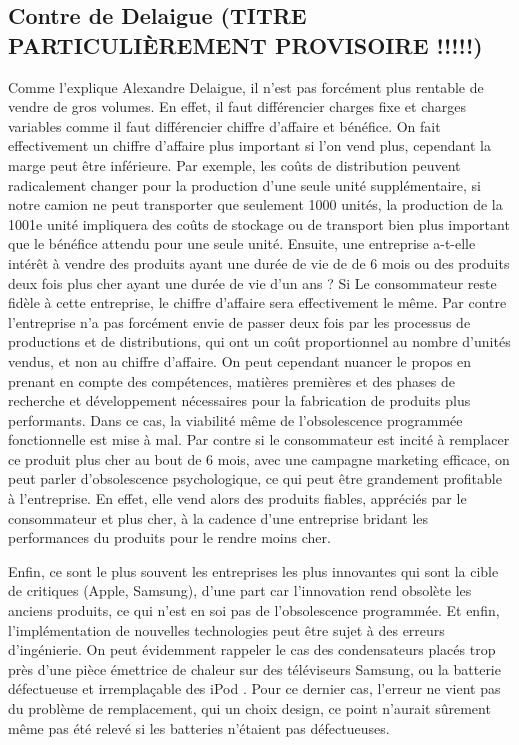 \subsection{Contre de Delaigue (TITRE PARTICULIÈREMENT PROVISOIRE !!!!!)}


Comme l’explique Alexandre Delaigue, il n’est pas forcément plus rentable de vendre de gros volumes. En effet, il faut différencier charges fixe et charges variables comme il faut différencier chiffre d’affaire et bénéfice. On fait effectivement un chiffre d’affaire plus important si l’on vend plus, cependant la marge peut être inférieure. Par exemple,  les coûts de distribution peuvent radicalement changer pour la production d’une seule unité supplémentaire, si notre camion ne peut transporter que seulement  1000 unités,  la production de la 1001e unité impliquera des coûts de stockage ou de transport bien plus important que le bénéfice attendu pour une seule unité. Ensuite, une entreprise a-t-elle intérêt à vendre des produits ayant une durée de vie de de 6 mois ou des produits deux fois plus cher ayant une durée de vie d’un ans ? Si Le consommateur reste fidèle à cette entreprise, le chiffre d’affaire sera effectivement le même. Par contre l’entreprise n’a pas forcément envie de passer deux fois par les processus de productions et de distributions, qui ont un coût proportionnel au nombre d’unités vendus, et non au chiffre d’affaire. On peut cependant nuancer le propos en prenant en compte des compétences, matières premières  et des phases de recherche et développement nécessaires pour la fabrication de produits plus performants. Dans ce cas, la viabilité même de l’obsolescence programmée fonctionnelle est mise à mal. Par contre si le consommateur est incité à remplacer ce produit plus cher au bout de 6 mois, avec une campagne marketing efficace, on peut parler d’obsolescence psychologique, ce qui peut être grandement  profitable à l’entreprise. En effet, elle vend alors des produits fiables, appréciés par le consommateur et plus cher, à la cadence d’une entreprise bridant les performances du produits pour le rendre moins cher.

Enfin, ce sont le plus souvent les entreprises les plus innovantes qui sont la cible de critiques (Apple, Samsung), d’une part car l’innovation rend obsolète les anciens produits, ce qui n’est en soi pas de l’obsolescence programmée. Et enfin, l’implémentation de nouvelles technologies peut être sujet à des erreurs d’ingénierie. On peut évidemment rappeler le cas des condensateurs placés trop près d’une pièce émettrice de  chaleur sur des téléviseurs Samsung, ou la batterie défectueuse et irremplaçable des iPod . Pour ce dernier cas, l’erreur ne vient pas du problème de remplacement, qui un choix design, ce point n’aurait sûrement même pas été relevé si les batteries n’étaient pas défectueuses.
